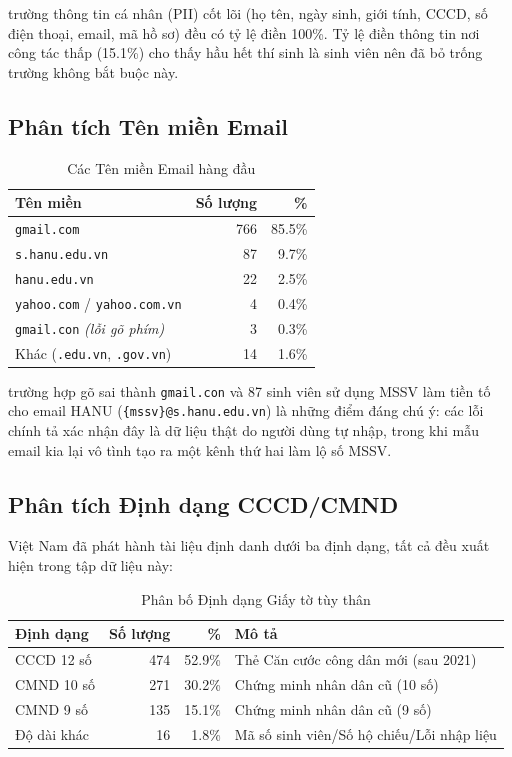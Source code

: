 \documentclass[12pt,a4paper]{article}
\begin{document}
 trường thông tin cá nhân (PII) cốt lõi (họ tên, ngày sinh, giới tính, CCCD, số điện thoại, email, mã hồ sơ) đều có tỷ lệ điền 100\%. Tỷ lệ điền thông tin nơi công tác thấp (15.1\%) cho thấy hầu hết thí sinh là sinh viên nên đã bỏ trống trường không bắt buộc này.

\subsection{Phân tích Tên miền Email}

\begin{table}[H]
\centering
\caption{Các Tên miền Email hàng đầu}
\begin{tabular}{@{}lrr@{}}
\toprule
\textbf{Tên miền} & \textbf{Số lượng} & \textbf{\%} \\
\midrule
\texttt{gmail.com} & 766 & 85.5\% \\
\texttt{s.hanu.edu.vn} & 87 & 9.7\% \\
\texttt{hanu.edu.vn} & 22 & 2.5\% \\
\texttt{yahoo.com} / \texttt{yahoo.com.vn} & 4 & 0.4\% \\
\texttt{gmail.con} \textit{(lỗi gõ phím)} & 3 & 0.3\% \\
Khác (\texttt{.edu.vn}, \texttt{.gov.vn}) & 14 & 1.6\% \\
\bottomrule
\end{tabular}
\end{table}

 trường hợp gõ sai thành \texttt{gmail.con} và 87 sinh viên sử dụng MSSV làm tiền tố cho email HANU (\texttt{\{mssv\}@s.hanu.edu.vn}) là những điểm đáng chú ý: các lỗi chính tả xác nhận đây là dữ liệu thật do người dùng tự nhập, trong khi mẫu email kia lại vô tình tạo ra một kênh thứ hai làm lộ số MSSV.

\subsection{Phân tích Định dạng CCCD/CMND}

Việt Nam đã phát hành tài liệu định danh dưới ba định dạng, tất cả đều xuất hiện trong tập dữ liệu này:

\begin{table}[H]
\centering
\caption{Phân bố Định dạng Giấy tờ tùy thân}
\begin{tabular}{@{}lrrp{5cm}@{}}
\toprule
\textbf{Định dạng} & \textbf{Số lượng} & \textbf{\%} & \textbf{Mô tả} \\
\midrule
CCCD 12 số & 474 & 52.9\% & Thẻ Căn cước công dân mới (sau 2021) \\
CMND 10 số & 271 & 30.2\% & Chứng minh nhân dân cũ (10 số) \\
CMND 9 số & 135 & 15.1\% & Chứng minh nhân dân cũ (9 số) \\
Độ dài khác & 16 & 1.8\% & Mã số sinh viên/Số hộ chiếu/Lỗi nhập liệu \\
\bottomrule
\end{tabular}
\end{table}
\end{document}
